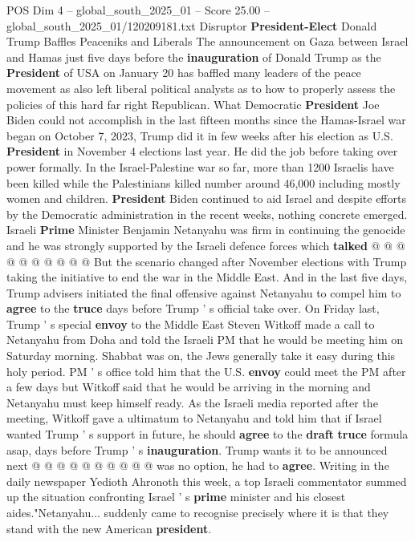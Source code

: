 \begin{textsample}{POS Dim 4 – global\_south\_2025\_01 – Score 25.00 – global\_south\_2025\_01/120209181.txt}  \label{ex:f4_pos_019}
Disruptor \textbf{President-Elect} Donald Trump Baffles Peaceniks and Liberals The announcement on Gaza between Israel and Hamas just five days before the \textbf{inauguration} of Donald Trump as the \textbf{President} of USA on January 20 has baffled many leaders of the peace movement as also left liberal political analysts as to how to properly assess the policies of this hard far right Republican.
What Democratic \textbf{President} Joe Biden could not accomplish in the last fifteen months since the Hamas-Israel war began on October 7, 2023, Trump did it in few weeks after his election as U.S. \textbf{President} in November 4 elections last year.
He did the job before taking over power formally.
In the Israel-Palestine war so far, more than 1200 Israelis have been killed while the Palestinians killed number around 46,000 including mostly women and children. \textbf{President} Biden continued to aid Israel and despite efforts by the Democratic administration in the recent weeks, nothing concrete emerged.
Israeli \textbf{Prime} Minister Benjamin Netanyahu was firm in continuing the genocide and he was strongly supported by the Israeli defence forces which \textbf{talked} @ @ @ @ @ @ @ @ @ @ But the scenario changed after November elections with Trump taking the initiative to end the war in the Middle East.
And in the last five days, Trump advisers initiated the final offensive against Netanyahu to compel him to \textbf{agree} to the \textbf{truce} days before Trump ' s official take over.
On Friday last, Trump ' s special \textbf{envoy} to the Middle East Steven Witkoff made a call to Netanyahu from Doha and told the Israeli PM that he would be meeting him on Saturday morning.
Shabbat was on, the Jews generally take it easy during this holy period.
PM ' s office told him that the U.S. \textbf{envoy} could meet the PM after a few days but Witkoff said that he would be arriving in the morning and Netanyahu must keep himself ready.
As the Israeli media reported after the meeting, Witkoff gave a ultimatum to Netanyahu and told him that if Israel wanted Trump ' s support in future, he should \textbf{agree} to the \textbf{draft} \textbf{truce} formula asap, days before Trump ' s \textbf{inauguration}.
Trump wants it to be announced next @ @ @ @ @ @ @ @ @ @ was no option, he had to \textbf{agree}.
Writing in the daily newspaper Yedioth Ahronoth this week, a top Israeli commentator summed up the situation confronting Israel ' s \textbf{prime} minister and his closest aides."Netanyahu... suddenly came to recognise precisely where it is that they stand with the new American \textbf{president}.

\end{textsample}
